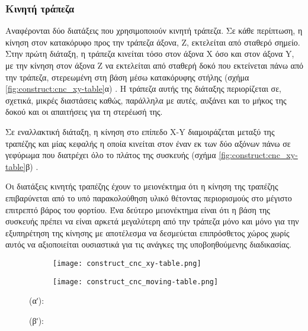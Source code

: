 \subsubsection{Κινητή τράπεζα}

Αναφέρονται δύο διατάξεις που χρησιμοποιούν κινητή τράπεζα. Σε κάθε περίπτωση, η
κίνηση στον κατακόρυφο προς την τράπεζα άξονα, Z, εκτελείται από σταθερό σημείο.
Στην πρώτη διάταξη, η τράπεζα κινείται τόσο στον άξονα X όσο και στον άξονα Y,
με την κίνηση στον άξονα Z να εκτελείται από σταθερή δοκό που εκτείνεται πάνω
από την τράπεζα, στερεωμένη στη βάση μέσω κατακόρυφης στήλης (σχήμα
\ref{fig:construct:cnc_xy-table}α) \parencite[69]{albert11}.
Η τράπεζα αυτής της διάταξης περιορίζεται σε, σχετικά, μικρές διαστάσεις καθώς,
παράλληλα με αυτές, αυξάνει και το μήκος της δοκού και οι απαιτήσεις για τη
στερέωσή της.

Σε εναλλακτική διάταξη, η κίνηση στο επίπεδο X-Y διαμοιράζεται μεταξύ της
τραπέζης και μίας κεφαλής η οποία κινείται στον έναν εκ των δύο αξόνων πάνω σε
γεφύρωμα που διατρέχει όλο το πλάτος της συσκευής (σχήμα
\ref{fig:construct:cnc_xy-table}β) \parencite[70]{albert11}.

Οι διατάξεις κινητής τραπέζης έχουν το μειονέκτημα ότι η κίνηση της τραπέζης
επιβαρύνεται από το υπό παρακολούθηση υλικό θέτοντας περιορισμούς στο μέγιστο
επιτρεπτό βάρος του φορτίου.
Ένα δεύτερο μειονέκτημα είναι ότι η βάση της συσκευής πρέπει να είναι αρκετά
μεγαλύτερη από την τράπεζα μόνο και μόνο για την εξυπηρέτηση της κίνησης με
αποτέλεσμα να δεσμεύεται επιπρόσθετος χώρος χωρίς αυτός να αξιοποιείται
ουσιαστικά για τις ανάγκες της υποβοηθούμενης διαδικασίας.

\begin{figure}
    \caption{Διατάξεις κινητής τραπέζης.
        \label{fig:construct:cnc_moving-table}}
    \begin{center}
        \begin{subfigure}[b]{0.30\textwidth}
            \texttt{[image: construct\_cnc\_xy-table.png]}
            \caption{}
        \end{subfigure}
        \begin{subfigure}[b]{0.45\textwidth}
            \texttt{[image: construct\_cnc\_moving-table.png]}
            \caption{}
        \end{subfigure}
    \end{center}

    (αʹ): 

    (βʹ): 
\end{figure}

